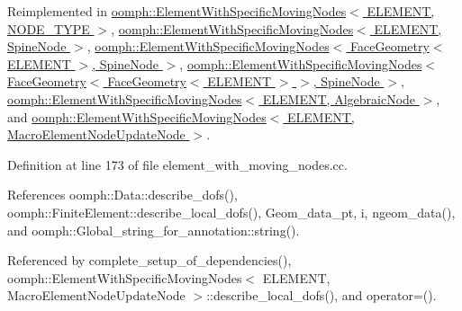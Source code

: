 Reimplemented in \hyperlink{classoomph_1_1ElementWithSpecificMovingNodes_abbcb617eac0cb1d5763fae6ff81cb154}{oomph\+::\+Element\+With\+Specific\+Moving\+Nodes$<$ E\+L\+E\+M\+E\+N\+T, N\+O\+D\+E\+\_\+\+T\+Y\+P\+E $>$}, \hyperlink{classoomph_1_1ElementWithSpecificMovingNodes_abbcb617eac0cb1d5763fae6ff81cb154}{oomph\+::\+Element\+With\+Specific\+Moving\+Nodes$<$ E\+L\+E\+M\+E\+N\+T, Spine\+Node $>$}, \hyperlink{classoomph_1_1ElementWithSpecificMovingNodes_abbcb617eac0cb1d5763fae6ff81cb154}{oomph\+::\+Element\+With\+Specific\+Moving\+Nodes$<$ Face\+Geometry$<$ E\+L\+E\+M\+E\+N\+T $>$, Spine\+Node $>$}, \hyperlink{classoomph_1_1ElementWithSpecificMovingNodes_abbcb617eac0cb1d5763fae6ff81cb154}{oomph\+::\+Element\+With\+Specific\+Moving\+Nodes$<$ Face\+Geometry$<$ Face\+Geometry$<$ E\+L\+E\+M\+E\+N\+T $>$ $>$, Spine\+Node $>$}, \hyperlink{classoomph_1_1ElementWithSpecificMovingNodes_abbcb617eac0cb1d5763fae6ff81cb154}{oomph\+::\+Element\+With\+Specific\+Moving\+Nodes$<$ E\+L\+E\+M\+E\+N\+T, Algebraic\+Node $>$}, and \hyperlink{classoomph_1_1ElementWithSpecificMovingNodes_abbcb617eac0cb1d5763fae6ff81cb154}{oomph\+::\+Element\+With\+Specific\+Moving\+Nodes$<$ E\+L\+E\+M\+E\+N\+T, Macro\+Element\+Node\+Update\+Node $>$}.



Definition at line 173 of file element\+\_\+with\+\_\+moving\+\_\+nodes.\+cc.



References oomph\+::\+Data\+::describe\+\_\+dofs(), oomph\+::\+Finite\+Element\+::describe\+\_\+local\+\_\+dofs(), Geom\+\_\+data\+\_\+pt, i, ngeom\+\_\+data(), and oomph\+::\+Global\+\_\+string\+\_\+for\+\_\+annotation\+::string().



Referenced by complete\+\_\+setup\+\_\+of\+\_\+dependencies(), oomph\+::\+Element\+With\+Specific\+Moving\+Nodes$<$ E\+L\+E\+M\+E\+N\+T, Macro\+Element\+Node\+Update\+Node $>$\+::describe\+\_\+local\+\_\+dofs(), and operator=().

\mbox{\label{classoomph_1_1ElementWithMovingNodes_ad8493e8dbf92f44106c10f8f58bfffa3}} 
